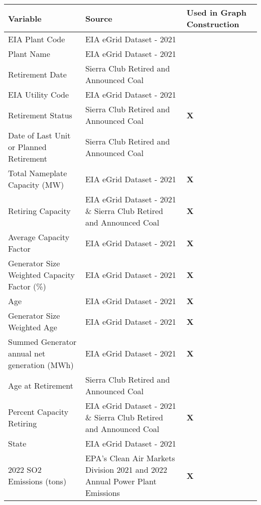 \begin{table}[H]
    \centering
    \small
    \begin{adjustbox}{width=\textwidth}
      \begin{tabular}{|l | l | l |}
        \toprule
        \textbf{Variable} & \textbf{Source} & \textbf{Used in Graph Construction} \\
        \midrule\midrule
        EIA Plant Code & EIA eGrid Dataset - 2021 & \\
        \midrule
        Plant Name & EIA eGrid Dataset - 2021 & \\
        \midrule
        Retirement Date & Sierra Club Retired and Announced Coal & \\
        \midrule
        EIA Utility Code & EIA eGrid Dataset - 2021 & \\
        \midrule
        Retirement Status & Sierra Club Retired and Announced Coal & \textbf{X} \\
        \midrule
        Date of Last Unit or Planned Retirement & Sierra Club Retired and Announced Coal & \\
        \midrule
        Total Nameplate Capacity (MW) & EIA eGrid Dataset - 2021 & \textbf{X} \\
        \midrule
        Retiring Capacity & EIA eGrid Dataset - 2021 \& Sierra Club Retired and Announced Coal & \textbf{X} \\
        \midrule
        Average Capacity Factor & EIA eGrid Dataset - 2021 & \textbf{X} \\
        \midrule
        Generator Size Weighted Capacity Factor (\%) & EIA eGrid Dataset - 2021 & \textbf{X} \\
        \midrule
        Age & EIA eGrid Dataset - 2021 & \textbf{X} \\
        \midrule
        Generator Size Weighted Age & EIA eGrid Dataset - 2021 & \textbf{X} \\
        \midrule
        Summed Generator annual net generation (MWh) & EIA eGrid Dataset - 2021 & \textbf{X} \\
        \midrule
        Age at Retirement & Sierra Club Retired and Announced Coal & \\
        \midrule
        Percent Capacity Retiring & EIA eGrid Dataset - 2021 \& Sierra Club Retired and Announced Coal & \textbf{X} \\
        \midrule
        State & EIA eGrid Dataset - 2021 & \\
        \midrule
        2022 SO2 Emissions (tons) & EPA's Clean Air Markets Division 2021 and 2022 Annual Power Plant Emissions & \textbf{X} \\

\end{tabular}
\end{adjustbox}
\end{table}
